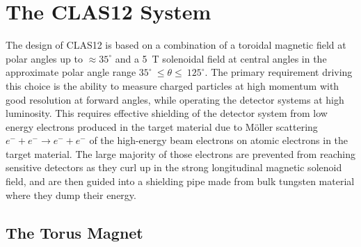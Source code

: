 \documentclass[final,3p,twocolumn]{elsarticle}
\begin{document}
\section{The CLAS12 System}

The design of CLAS12 is based on a combination of a toroidal magnetic field at polar angles up to $\approx 35^\circ$ and a 5~T 
solenoidal field at central angles in the approximate polar angle range $35^\circ~\le \theta \le~125^\circ$. The primary requirement 
driving this choice is the ability to measure charged  
particles at high momentum with good resolution at forward angles, while operating the detector systems at high luminosity. 
This requires effective shielding of the detector system from low energy electrons produced in the target material due to M\"oller 
scattering $e^- + e^- \to e^- + e^-$ of the high-energy beam electrons on atomic electrons in the target material. The large majority of those 
electrons are prevented from reaching 
sensitive detectors as they curl up in the strong longitudinal magnetic solenoid field, and are then guided into a shielding pipe 
made from bulk tungsten material where they dump their energy. 

\subsection{\rm The Torus Magnet}
\label{torus}
\end{document}
